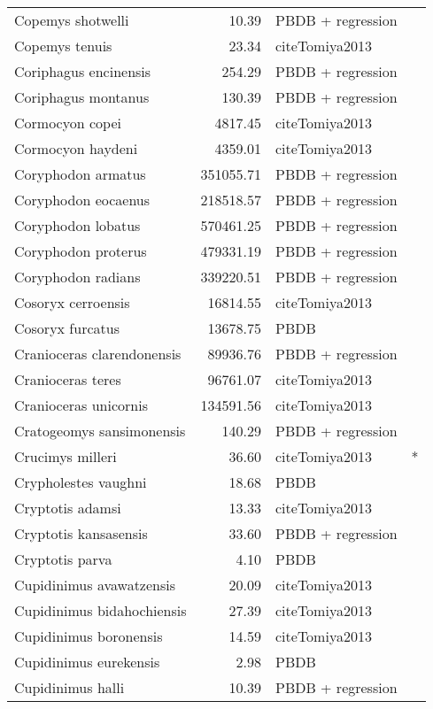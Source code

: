 \begin{table}[ht]
\begin{tabular}{lrll}
  Copemys shotwelli & 10.39 & PBDB + regression &  \\ 
  Copemys tenuis & 23.34 & cite{Tomiya2013} &  \\ 
  Coriphagus encinensis & 254.29 & PBDB + regression &  \\ 
  Coriphagus montanus & 130.39 & PBDB + regression &  \\ 
  Cormocyon copei & 4817.45 & cite{Tomiya2013} &  \\ 
  Cormocyon haydeni & 4359.01 & cite{Tomiya2013} &  \\ 
  Coryphodon armatus & 351055.71 & PBDB + regression &  \\ 
  Coryphodon eocaenus & 218518.57 & PBDB + regression &  \\ 
  Coryphodon lobatus & 570461.25 & PBDB + regression &  \\ 
  Coryphodon proterus & 479331.19 & PBDB + regression &  \\ 
  Coryphodon radians & 339220.51 & PBDB + regression &  \\ 
  Cosoryx cerroensis & 16814.55 & cite{Tomiya2013} &  \\ 
  Cosoryx furcatus & 13678.75 & PBDB &  \\ 
  Cranioceras clarendonensis & 89936.76 & PBDB + regression &  \\ 
  Cranioceras teres & 96761.07 & cite{Tomiya2013} &  \\ 
  Cranioceras unicornis & 134591.56 & cite{Tomiya2013} &  \\ 
  Cratogeomys sansimonensis & 140.29 & PBDB + regression &  \\ 
  Crucimys milleri & 36.60 & cite{Tomiya2013} & * \\ 
  Crypholestes vaughni & 18.68 & PBDB &  \\ 
  Cryptotis adamsi & 13.33 & cite{Tomiya2013} &  \\ 
  Cryptotis kansasensis & 33.60 & PBDB + regression &  \\ 
  Cryptotis parva & 4.10 & PBDB &  \\ 
  Cupidinimus avawatzensis & 20.09 & cite{Tomiya2013} &  \\ 
  Cupidinimus bidahochiensis & 27.39 & cite{Tomiya2013} &  \\ 
  Cupidinimus boronensis & 14.59 & cite{Tomiya2013} &  \\ 
  Cupidinimus eurekensis & 2.98 & PBDB &  \\ 
  Cupidinimus halli & 10.39 & PBDB + regression &  \\ 

\end{tabular}
\end{table}
